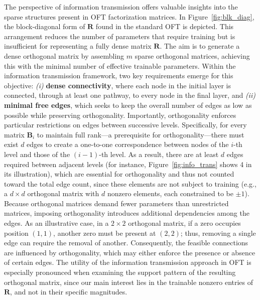 The perspective of information transmission offers valuable insights into the sparse structures present in OFT factorization matrices. In Figure~\ref{fig:blk_diag}, the block-diagonal form of $\bm{R}$ found in the standard OFT is depicted. This arrangement reduces the number of parameters that require training but is insufficient for representing a fully dense matrix $\bm{R}$. The aim is to generate a dense orthogonal matrix by assembling $m$ sparse orthogonal matrices, achieving this with the minimal number of effective trainable parameters. Within the information transmission framework, two key requirements emerge for this objective: \emph{(i)} \textbf{dense connectivity}, where each node in the initial layer is connected, through at least one pathway, to every node in the final layer, and \emph{(ii)} \textbf{minimal free edges}, which seeks to keep the overall number of edges as low as possible while preserving orthogonality. Importantly, orthogonality enforces particular restrictions on edges between successive levels. Specifically, for every matrix $\bm{B}_i$ to maintain full rank—a prerequisite for orthogonality—there must exist $d$ edges to create a one-to-one correspondence between nodes of the $i$-th level and those of the $(i-1)$-th level. As a result, there are at least $d$ edges required between adjacent levels (for instance, Figure~\ref{fig:info_trans} shows 4 in its illustration), which are essential for orthogonality and thus not counted toward the total edge count, since these elements are not subject to training (e.g., a $d \times d$ orthogonal matrix with $d$ nonzero elements, each constrained to be $\pm 1$). Because orthogonal matrices demand fewer parameters than unrestricted matrices, imposing orthogonality introduces additional dependencies among the edges. As an illustrative case, in a $2\times2$ orthogonal matrix, if a zero occupies position $(1,1)$, another zero must be present at $(2,2)$; thus, removing a single edge can require the removal of another. Consequently, the feasible connections are influenced by orthogonality, which may either enforce the presence or absence of certain edges. The utility of the information transmission approach in OFT is especially pronounced when examining the support pattern of the resulting orthogonal matrix, since our main interest lies in the trainable nonzero entries of $\bm{R}$, and not in their specific magnitudes.

